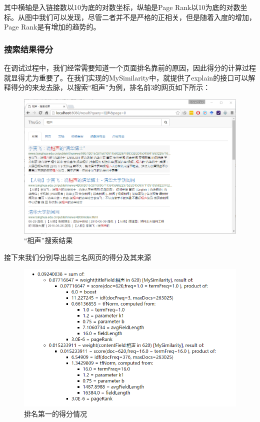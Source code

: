 \documentclass[paper=a4, fontsize=11pt, UTF8]{article} %
\numberwithin{equation}{section} %
\numberwithin{figure}{section} %
\numberwithin{table}{section} %
\begin{document}
其中横轴是入链接数以10为底的对数坐标，纵轴是Page Rank以10为底的对数坐标。从图中我们可以发现，尽管二者并不是严格的正相关，但是随着入度的增加，Page Rank是有增加的趋势的。

\subsubsection{搜索结果得分}

在调试过程中，我们经常需要知道一个页面排名靠前的原因，因此得分的计算过程就显得尤为重要了。在我们实现的MySimilarity中，就提供了explain的接口可以解释得分的来龙去脉，以搜索“相声”为例，排名前3的网页如下所示：

\begin{figure}[htp]
\center
\includegraphics[width=\textwidth]{ss7}
\caption{“相声”搜索结果} \label{ss7}
\end{figure}

接下来我们分别导出前三名网页的得分及其来源

\begin{figure}[htp]
\center
\includegraphics[scale=0.5]{t1}
\caption{排名第一的得分情况}
\end{figure}
\end{document}
